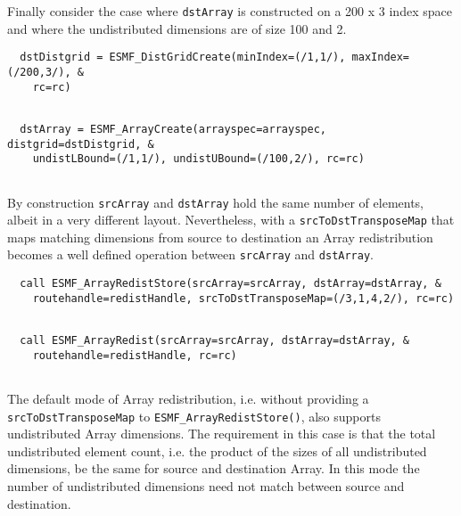 
   Finally consider the case where {\tt dstArray} is constructed on a 
   200 x 3 index space and where the undistributed dimensions are of size
   100 and 2. 

 \begin{verbatim}
  dstDistgrid = ESMF_DistGridCreate(minIndex=(/1,1/), maxIndex=(/200,3/), &
    rc=rc)
 
\end{verbatim}
 

 \begin{verbatim}
  dstArray = ESMF_ArrayCreate(arrayspec=arrayspec, distgrid=dstDistgrid, &
    undistLBound=(/1,1/), undistUBound=(/100,2/), rc=rc)
 
\end{verbatim}
 

   By construction {\tt srcArray} and {\tt dstArray} hold the same number of
   elements, albeit in a very different layout. Nevertheless, with a
   {\tt srcToDstTransposeMap} that maps matching dimensions from source to
   destination an Array redistribution becomes a well defined operation between
   {\tt srcArray} and {\tt dstArray}. 

 \begin{verbatim}
  call ESMF_ArrayRedistStore(srcArray=srcArray, dstArray=dstArray, &
    routehandle=redistHandle, srcToDstTransposeMap=(/3,1,4,2/), rc=rc)
 
\end{verbatim}
 

 \begin{verbatim}
  call ESMF_ArrayRedist(srcArray=srcArray, dstArray=dstArray, &
    routehandle=redistHandle, rc=rc)
 
\end{verbatim}
 

   \begin{sloppypar}
   The default mode of Array redistribution, i.e. without providing a
   {\tt srcToDstTransposeMap} to {\tt ESMF\_ArrayRedistStore()}, also supports
   undistributed Array dimensions. The requirement in this case is that the 
   total undistributed element count, i.e. the product of the sizes of all
   undistributed dimensions, be the same for source and destination Array.
   In this mode the number of undistributed dimensions need not match between
   source and destination.
   \end{sloppypar} 

